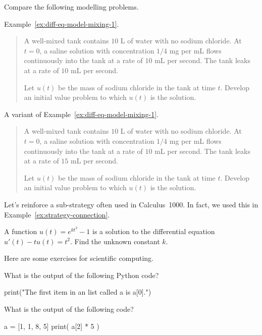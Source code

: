 \documentclass[../main.tex]{subfiles}
\begin{document}
\begin{example}
  Compare the following modelling problems. 

  Example~\ref{ex:diff-eq-model-mixing-1}.
  \begin{quote}
    A well-mixed tank contains \(10\) L of water with no sodium chloride. At \(t = 0\), a saline solution with concentration \(1/4\) mg per mL flows continuously into the tank at a rate of \(10\) mL per second. The tank leaks at a rate of \(10\) mL per second. 

    Let \(u(t)\) be the mass of sodium chloride in the tank at time \(t\). Develop an initial value problem to which \(u(t)\) is the solution.
  \end{quote}

  A variant of Example~\ref{ex:diff-eq-model-mixing-1}.
  \begin{quote}
    A well-mixed tank contains \(10\) L of water with no sodium chloride. At \(t = 0\), a saline solution with concentration \(1/4\) mg per mL flows continuously into the tank at a rate of \(10\) mL per second. The tank leaks at a rate of \(15\) mL per second. 

    Let \(u(t)\) be the mass of sodium chloride in the tank at time \(t\). Develop an initial value problem to which \(u(t)\) is the solution.
  \end{quote}
\end{example}
\clearpage

Let's reinforce a sub-strategy often used in Calculus~1000.  In fact, we used this in Example~\ref{ex:strategy-connection}. 

\begin{example}
  A function \(u(t) = e^{kt^{2}} - 1\) is a solution to the differential equation \(u'(t) - tu(t) = t^{2}\).  Find the unknown constant \(k\).

\end{example}

\clearpage
Here are some exercises for scientific computing.
\begin{example}
  What is the output of the following Python code?

  \begin{pythoncode}
print("The first item in an list called a is a[0].")
  \end{pythoncode}
\end{example}

\begin{example}
  What is the output of the following code?

  \begin{pythoncode}
a = [1, 1, 8, 5]
print( a[2] * 5 )
  \end{pythoncode}
\end{example}
\end{document}
